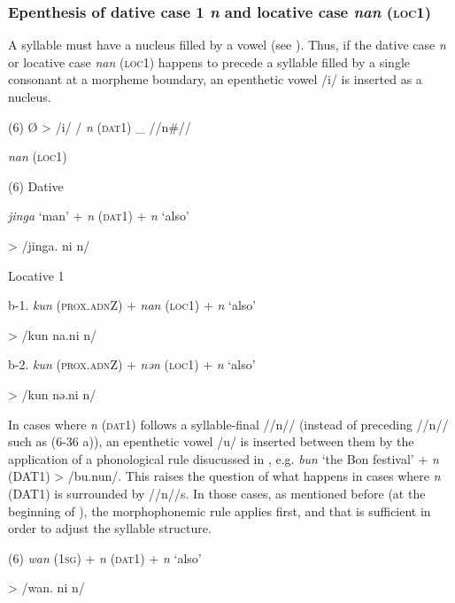 \subsubsection{Epenthesis of dative case 1 \textit{n} and locative case \textit{nan} (\textsc{loc}1)}

A syllable must have a nucleus filled by a vowel (see ). Thus, if the dative case \textit{n} or locative case \textit{nan} (\textsc{loc}1) happens to precede a syllable filled by a single consonant at a morpheme boundary, an epenthetic vowel /i/ is inserted as a nucleus.

(6)  Ø  >  /i/  /  %
  \textit{n}  %
(\textsc{dat}1)    \_  //n\#//

            \textit{nan}  (\textsc{loc}1)

(6) \ea Dative\\
\gll

    \textit{jinga}  ‘man’  +  \textit{n}  (\textsc{dat}1)  +  \textit{n}  ‘also’

  >  /jinga.      ni      n/  

 \ex Locative 1\\
\gll

  b-1.  \textit{kun}  (\textsc{prox}.\textsc{adn}Z)  +  \textit{nan}  (\textsc{loc}1)  +  \textit{n}  ‘also’

  >  /kun      na.ni      n/  

  b-2.  \textit{kun}  (\textsc{prox}.\textsc{adn}Z)  +  \textit{nən}  (\textsc{loc}1)  +  \textit{n}  ‘also’

  >  /kun      nə.ni      n/  

In cases where \textit{n} (\textsc{dat}1) follows a syllable-final //n// (instead of preceding //n// such as (6-36 a)), an epenthetic vowel /u/ is inserted between them by the application of a phonological rule disucussed in , e.g. \textit{bun} ‘the Bon festival’ + \textit{n} (DAT1) > /bu.nun/. This raises the question of what happens in cases where \textit{n} (DAT1) is surrounded by //n//s. In those cases, as mentioned before (at the beginning of ), the morphophonemic rule  applies first, and that is sufficient in order to adjust the syllable structure.

(6)    \textit{wan}  (1\textsc{sg})  +  \textit{n}  (\textsc{dat}1)  +  \textit{n}  ‘also’

  >  /wan.      ni      n/  

